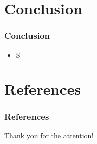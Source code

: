 \section{Conclusion}

\begin{frame}
  \frametitle{Conclusion}

  \pause
  \begin{itemize}
    \item<+-> S
  \end{itemize}
\end{frame}

\section*{References}
\begin{frame}%
  \frametitle{References}
  \nocite{*}
  
  
\end{frame}

\begin{frame}
  \centering
  {\Huge Thank you for the attention!}
\end{frame}


